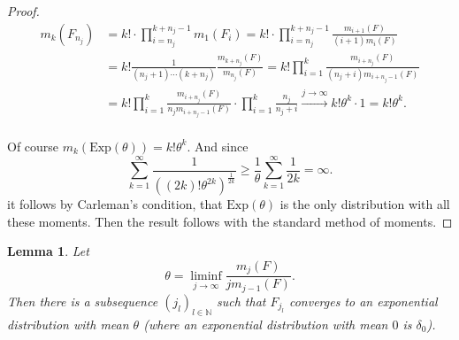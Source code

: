 \documentclass[12pt,a4paper]{scrartcl}
\newtheorem{lemma}[theorem]{Lemma}
\numberwithin{equation}{section}
\newcommand{\N}{\mathbb{N}} %
\begin{document}
\begin{proof}

\begin{align*}
m_k\left(F_{n_j}\right) 
&= k! \cdot \prod_{i=n_j}^{k+n_j-1}{m_1\left(F_i\right)} = k! \cdot \prod_{i=n_j}^{k+n_j-1} \frac{m_{i+1}\left(F\right)}{\left(i+1\right) m_i\left(F\right)} \\
&= k! \frac{1}{\left(n_j+1\right)\cdots \left(k+n_j\right)} \frac{m_{k+n_j}\left(F\right)}{m_{n_j}\left(F\right)} = k! \prod_{i=1}^k \frac{m_{i+n_j}\left(F\right)}{\left(n_j+i\right) m_{i+n_j-1}\left(F\right)} \\
&= k! \prod_{i=1}^k \frac{m_{i+n_j}\left(F\right)}{n_j m_{i+n_j-1}\left(F\right)} \cdot \prod_{i=1}^k \frac{n_j}{n_j+i} \overset{j \to \infty}{\to} k! \theta^k \cdot 1 = k! \theta^k.
\end{align*} \\[1ex]

Of course $ m_k\left( \text{Exp}\left(\theta\right)\right) = k! \theta^k $. And since
$$ \sum_{k=1}^{\infty} \frac{1}{\left(\left(2k\right)!\theta^{2k}\right)^{\frac{1}{2k}}} \geq \frac{1}{\theta} \sum_{k=1}^{\infty} \frac{1}{2k} = \infty.$$
it follows by Carleman’s condition, that $\text{Exp}\left(\theta\right)$ is the only distribution with all these moments.
Then the result follows with the standard method of moments.

\end{proof}

\begin{lemma} \label{Weneeditlaterr}Let
\begin{equation*}
\theta = \liminf_{j \to \infty} \frac{m_{j}\left(F\right)}{j m_{j-1}\left(F\right)}.
\end{equation*}
Then there is a subsequence $\left(j_l\right)_{l \in \N}$ such that $ F_{j_l} $ converges to an exponential distribution with mean $\theta$ (where an exponential distribution with mean $0$ is $\delta_0$).
\end{lemma}
\end{document}
